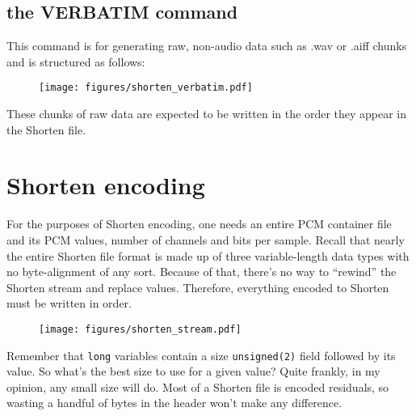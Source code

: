 \subsection{the VERBATIM command}

This command is for generating raw, non-audio data such
as .wav or .aiff chunks and is structured as follows:
\begin{figure}[h]
\texttt{[image: figures/shorten\_verbatim.pdf]}
\end{figure}
\par
\noindent
These chunks of raw data are expected to be written in the order
they appear in the Shorten file.

\pagebreak

\section{Shorten encoding}

For the purposes of Shorten encoding,
one needs an entire PCM container file and its
PCM values, number of channels and bits per sample.
Recall that nearly the entire Shorten file format is made up
of three variable-length data types with no byte-alignment of any sort.
Because of that, there's no way to ``rewind'' the Shorten stream
and replace values.
Therefore, everything encoded to Shorten must be written in order.

\begin{figure}[h]
\texttt{[image: figures/shorten\_stream.pdf]}
\end{figure}
\par
\noindent
Remember that \texttt{long} variables contain a size \texttt{unsigned(2)}
field followed by its value.
So what's the best size to use for a given value?
Quite frankly, in my opinion, any small size will do.
Most of a Shorten file is encoded residuals, so wasting a handful
of bytes in the header won't make any difference.


